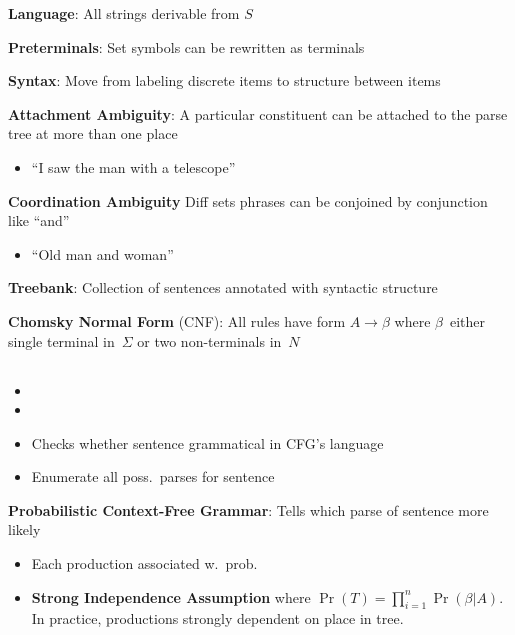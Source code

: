\documentclass[9pt]{extarticle}
\renewcommand{\green}[1]{{\color{ForestGreen} #1}}
\newcommand{\greenbf}[1]{\textbf{\green{#1}}}
\begin{document}
\begin{multicols}{3}
  \textbf{Language}: All strings derivable from $S$

  \textbf{Preterminals}: Set symbols can be rewritten as terminals

  \textbf{Syntax}: Move from labeling discrete items to structure between items

  \greenbf{Attachment Ambiguity}: A particular constituent can be attached to the parse tree at more than one place
  \begin{itemize}
    \item ``I saw the man with a telescope''
  \end{itemize}

  \greenbf{Coordination Ambiguity} Diff sets phrases can be conjoined by conjunction like ``and''
  \begin{itemize}
    \item ``Old man and woman''
  \end{itemize}

  \greenbf{Treebank}: Collection of sentences annotated with syntactic structure

  \greenbf{Chomsky Normal Form} (CNF): All rules have form ${A \rightarrow \beta}$ where $\beta$~either single terminal in~$\Sigma$ or two non-terminals in~$N$

  \subsection*{}

  \begin{itemize}
    \item {}
    \item \red{Every time has below it a range ${[start,end)}$}
    \item Checks whether sentence grammatical in CFG's language
    \item Enumerate all poss.\ parses for sentence
  \end{itemize}

  \greenbf{Probabilistic Context-Free Grammar}: Tells which parse of sentence more likely
  \begin{itemize}
    \item Each production associated w.\ prob.
    \item \textbf{Strong Independence Assumption} where ${\Pr(T) = \prod_{i=1}^{n} \Pr(\beta \vert A)}$. In practice, productions strongly dependent on place in tree.
  \end{itemize}


\end{multicols}
\end{document}
